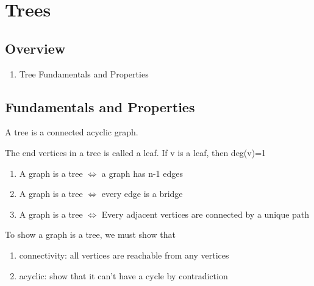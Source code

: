 \documentclass{article}
\begin{document}
\section{Trees}%
\label{sec:Trees}

\subsection{Overview}%
\label{sub:Overview}

\begin{enumerate}
    \item Tree Fundamentals and Properties
\end{enumerate}

\subsection{Fundamentals and Properties}

\begin{definition}[Trees]
    A tree is a connected acyclic graph.
\end{definition}

\begin{definition}[Leaf]
    The end vertices in a tree is called a leaf. If v is a leaf, then
    deg(v)=1
\end{definition}


\begin{remark}
    \begin{enumerate}
        \item A graph is a tree $\Longleftrightarrow$ a graph has n-1 edges
        \item A graph is a tree $\Longleftrightarrow$ every edge is a bridge
        \item A graph is a tree $\Longleftrightarrow$ Every adjacent
	    vertices are connected by a unique path
    \end{enumerate}
\end{remark}

\begin{problem}
    To show a graph is a tree, we must show that
    \begin{enumerate}
        \item connectivity: all vertices are reachable from any vertices
	\item acyclic: show that it can't have a cycle by contradiction
    \end{enumerate}
\end{problem}
\end{document}
